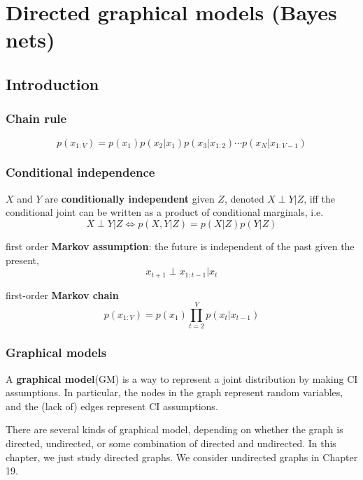 \chapter{Directed graphical models (Bayes nets)}


\section{Introduction}


\subsection{Chain rule}
\begin{equation}
p(x_{1:V}) = p(x_1)p(x_2|x_1)p(x_3|x_{1:2})\cdots p(x_N|x_{1:V-1})
\end{equation}

\subsection{Conditional independence}
$X$ and $Y$ are \textbf{conditionally independent} given $Z$, denoted $X \perp Y|Z$, iff the conditional joint can be written as a product of conditional marginals, i.e.
\begin{equation}
X \perp Y|Z \Longleftrightarrow p(X,Y|Z)=p(X|Z)p(Y|Z)
\end{equation}

first order \textbf{Markov assumption}: the future is independent of the past given the present, 
\begin{equation}
x_{t+1} \perp x_{1:t-1}|x_t
\end{equation}

first-order \textbf{Markov chain}
\begin{equation}
p(x_{1:V}) = p(x_1)\prod\limits_{t=2}^V p(x_t|x_{t-1})
\end{equation}


\subsection{Graphical models}
A \textbf{graphical model}(GM) is a way to represent a joint distribution by making CI assumptions. In particular, the nodes in the graph represent random variables, and the (lack of) edges represent CI assumptions.

There are several kinds of graphical model, depending on whether the graph is directed, undirected, or some combination of directed and undirected. In this chapter, we just study directed graphs. We consider undirected graphs in Chapter 19.


